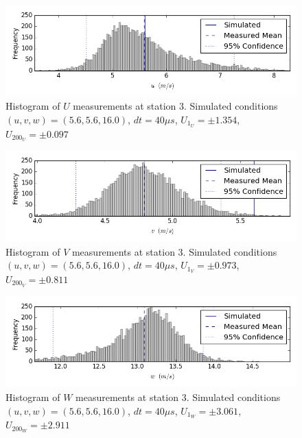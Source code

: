 \begin{figure}[H]
\centering
\includegraphics[width=6in]{figs/Ely_May28th03002/uncertainty_Ely_May28th03002_U}
\caption{Histogram of $U$ measurements at station 3. Simulated conditions $(u,v,w)=(5.6, 5.6, 16.0)$, $dt=40 \mu s$, $U_1_U=\pm 1.354$, $U_200_U=\pm 0.097$}
\label{fig:uncertainty_Ely_May28th03002_U}
\end{figure}


\begin{figure}[H]
\centering
\includegraphics[width=6in]{figs/Ely_May28th03002/uncertainty_Ely_May28th03002_V}
\caption{Histogram of $V$ measurements at station 3. Simulated conditions $(u,v,w)=(5.6, 5.6, 16.0)$, $dt=40 \mu s$, $U_1_V=\pm 0.973$, $U_200_V=\pm 0.811$}
\label{fig:uncertainty_Ely_May28th03002_V}
\end{figure}


\begin{figure}[H]
\centering
\includegraphics[width=6in]{figs/Ely_May28th03002/uncertainty_Ely_May28th03002_W}
\caption{Histogram of $W$ measurements at station 3. Simulated conditions $(u,v,w)=(5.6, 5.6, 16.0)$, $dt=40 \mu s$, $U_1_W=\pm 3.061$, $U_200_W=\pm 2.911$}
\label{fig:uncertainty_Ely_May28th03002_W}
\end{figure}


